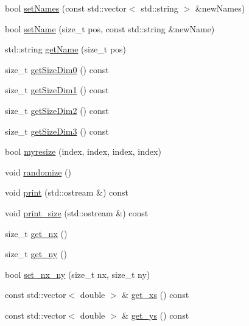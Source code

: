 \begin{DoxyCompactItemize}
\item 
bool \mbox{\hyperlink{class_array4_d_a8715e92d0a11f73a16ac3d67b7527f86}{set\+Names}} (const std\+::vector$<$ std\+::string $>$ \&new\+Names)
\item 
bool \mbox{\hyperlink{class_array4_d_a921401f1e3a471b6b5665d718c636daf}{set\+Name}} (size\+\_\+t pos, const std\+::string \&new\+Name)
\item 
std\+::string \mbox{\hyperlink{class_array4_d_a21932242976a122108f7cdf845f7aeca}{get\+Name}} (size\+\_\+t pos)
\item 
size\+\_\+t \mbox{\hyperlink{class_array4_d_afc2d361e388a5faba62caef697033911}{get\+Size\+Dim0}} () const
\item 
size\+\_\+t \mbox{\hyperlink{class_array4_d_a32f89196e8a5384f8a207812376f716d}{get\+Size\+Dim1}} () const
\item 
size\+\_\+t \mbox{\hyperlink{class_array4_d_abc321f73fd2665ac1c58afaf3ebe60e6}{get\+Size\+Dim2}} () const
\item 
size\+\_\+t \mbox{\hyperlink{class_array4_d_af767db0beba39cd815b903a8076d2695}{get\+Size\+Dim3}} () const
\item 
bool \mbox{\hyperlink{class_array4_d_ae829ad7badd47b721a9ecea2324f3168}{myresize}} (index, index, index, index)
\item 
void \mbox{\hyperlink{class_array4_d_a15626fe44d3792ccc2822afb30bcbd98}{randomize}} ()
\item 
void \mbox{\hyperlink{class_array4_d_ad4bf624213ab880802c14204a54bb1b4}{print}} (std\+::ostream \&) const
\item 
void \mbox{\hyperlink{class_array4_d_a838161eccbcb59c67d8ec5167e710cb2}{print\+\_\+size}} (std\+::ostream \&) const
\item 
size\+\_\+t \mbox{\hyperlink{class_array4_d_a2f9f3a7f699f705ebbc3067adf923922}{get\+\_\+nx}} ()
\item 
size\+\_\+t \mbox{\hyperlink{class_array4_d_a6f75a07d72213eff83aabbfd8442d1d3}{get\+\_\+ny}} ()
\item 
bool \mbox{\hyperlink{class_array4_d_a4071001d8fd5248bcaf89c54556a6fe2}{set\+\_\+nx\+\_\+ny}} (size\+\_\+t nx, size\+\_\+t ny)
\item 
const std\+::vector$<$ double $>$ \& \mbox{\hyperlink{class_array4_d_a5b72fa60e0feacd807d4d2e7bd1bf5fd}{get\+\_\+xs}} () const
\item 
const std\+::vector$<$ double $>$ \& \mbox{\hyperlink{class_array4_d_a3f6fa1fc8bc07a3aa51cbdada40e25e7}{get\+\_\+ys}} () const
\item 

\end{DoxyCompactItemize}
